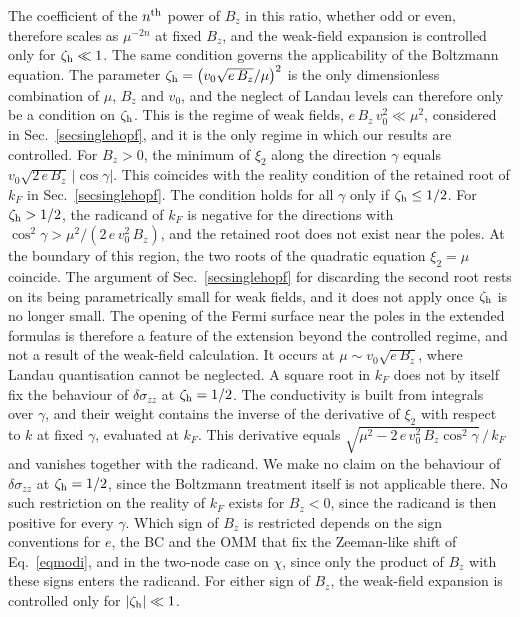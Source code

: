 \documentclass[aps,prb,onecolumn,nofootinbib,citeautoscript,10pt]{revtex4-2}
\begin{document}
The coefficient of the $n^{\rm th}$ power of $B_z$ in this ratio, whether odd or even, therefore scales as $\mu^{-2n}$ at fixed $B_z$, and the weak-field expansion is controlled only for $\zeta_{\rm h}\ll1$. The same condition governs the applicability of the Boltzmann equation. The parameter $\zeta_{\rm h}=\left(v_0\sqrt{e\,B_z}/\mu\right)^2$ is the only dimensionless combination of $\mu$, $B_z$ and $v_0$, and the neglect of Landau levels can therefore only be a condition on $\zeta_{\rm h}$. This is the regime of weak fields, $e\,B_z\,v_0^2\ll\mu^2$, considered in Sec.~\ref{secsinglehopf}, and it is the only regime in which our results are controlled. For $B_z>0$, the minimum of $\xi_2$ along the direction $\gamma$ equals $v_0\sqrt{2\,e\,B_z}\,|\cos\gamma|$. This coincides with the reality condition of the retained root of $k_F$ in Sec.~\ref{secsinglehopf}. The condition holds for all $\gamma$ only if $\zeta_{\rm h}\le1/2$. For $\zeta_{\rm h}>1/2$, the radicand of $k_F$ is negative for the directions with $\cos^2\gamma>\mu^2/(2\,e\,v_0^2\,B_z)$, and the retained root does not exist near the poles. At the boundary of this region, the two roots of the quadratic equation $\xi_2=\mu$ coincide. The argument of Sec.~\ref{secsinglehopf} for discarding the second root rests on its being parametrically small for weak fields, and it does not apply once $\zeta_{\rm h}$ is no longer small. The opening of the Fermi surface near the poles in the extended formulas is therefore a feature of the extension beyond the controlled regime, and not a result of the weak-field calculation. It occurs at $\mu\sim v_0\sqrt{e\,B_z}$, where Landau quantisation cannot be neglected. A square root in $k_F$ does not by itself fix the behaviour of $\delta\sigma_{zz}$ at $\zeta_{\rm h}=1/2$. The conductivity is built from integrals over $\gamma$, and their weight contains the inverse of the derivative of $\xi_2$ with respect to $k$ at fixed $\gamma$, evaluated at $k_F$. This derivative equals $\sqrt{\mu^2-2\,e\,v_0^2\,B_z\cos^2\gamma}\,/\,k_F$ and vanishes together with the radicand. We make no claim on the behaviour of $\delta\sigma_{zz}$ at $\zeta_{\rm h}=1/2$, since the Boltzmann treatment itself is not applicable there. No such restriction on the reality of $k_F$ exists for $B_z<0$, since the radicand is then positive for every $\gamma$. Which sign of $B_z$ is restricted depends on the sign conventions for $e$, the BC and the OMM that fix the Zeeman-like shift of Eq.~\eqref{eqmodi}, and in the two-node case on $\chi$, since only the product of $B_z$ with these signs enters the radicand. For either sign of $B_z$, the weak-field expansion is controlled only for $|\zeta_{\rm h}|\ll1$.
\end{document}
